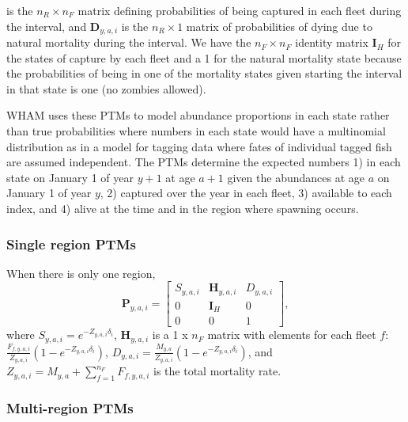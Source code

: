 \documentclass[
]{article}
\begin{document}
is the \(n_R \times n_F\) matrix defining probabilities of being captured in each fleet during the interval, and \(\mathbf{D}_{y,a,i}\) is the \(n_R \times 1\) matrix of probabilities of dying due to natural mortality during the interval. We have the \(n_F\times n_F\) identity matrix \(\mathbf{I}_{H}\) for the states of capture by each fleet and a 1 for the natural mortality state because the probabilities of being in one of the mortality states given starting the interval in that state is one (no zombies allowed).

WHAM uses these PTMs to model abundance proportions in each state rather than true probabilities where numbers in each state would have a multinomial distribution as in a model for tagging data where fates of individual tagged fish are assumed independent. The PTMs determine the expected numbers 1) in each state on January 1 of year \(y+1\) at age \(a+1\) given the abundances at age \(a\) on January 1 of year \(y\), 2) captured over the year in each fleet, 3) available to each index, and 4) alive at the time and in the region where spawning occurs.

\hypertarget{single-region-ptms}{%
\subsubsection*{Single region PTMs}\label{single-region-ptms}}

When there is only one region,
\begin{equation}\label{eq:ptm_1_region}
\mathbf{P}_{y,a,i} = 
  \begin{bmatrix}
     S_{y,a,i} & \mathbf{H}_{y,a,i} & D_{y,a,i} \\
     0 & \mathbf{I}_{H} & 0\\
     0 & 0 & 1
  \end{bmatrix},
\end{equation}
where \(S_{y,a,i} = e^{-Z_{y,a,i}\delta_i}\), \(\mathbf{H}_{y,a,i}\) is a 1 x \(n_F\) matrix with elements for each fleet \(f\): \(\frac{F_{f,y,a,i}}{Z_{y,a,i}}\left(1 - e^{-Z_{y,a,i}\delta_i}\right)\), \(D_{y,a,i} = \frac{M_{y,a}}{Z_{y,a,i}}\left(1 - e^{-Z_{y,a,i}\delta_i}\right)\), and \(Z_{y,a,i} = M_{y,a} + \sum^{n_F}_{f=1} F_{f,y,a,i}\) is the total mortality rate.

\hypertarget{multi-region-ptms}{%
\subsubsection*{Multi-region PTMs}\label{multi-region-ptms}}
\end{document}
